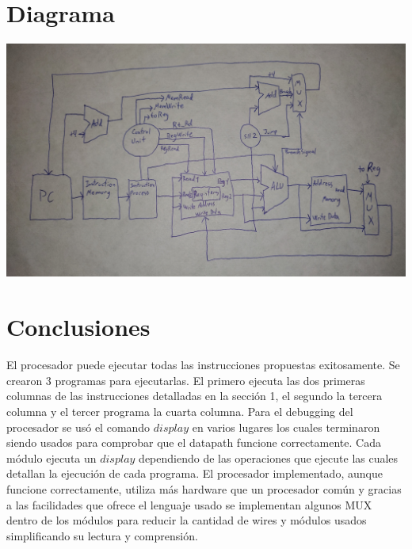\documentclass[12pt,a4paper]{article}
\begin{document}
\section{Diagrama}

\includegraphics[width=14cm]{./datapath.jpg}

\newpage

\section{Conclusiones}
El procesador puede ejecutar todas las instrucciones propuestas exitosamente. Se crearon 3 programas para ejecutarlas. El primero ejecuta las dos primeras columnas de las instrucciones detalladas en la sección 1, el segundo la tercera columna y el tercer programa la cuarta columna. Para el debugging del procesador se usó el comando $display$ en varios lugares los cuales terminaron siendo usados para comprobar que el datapath funcione correctamente. Cada módulo ejecuta un $display$ dependiendo de las operaciones que ejecute las cuales detallan la ejecución de cada programa. El procesador implementado, aunque funcione correctamente, utiliza más hardware que un procesador común y gracias a las facilidades que ofrece el lenguaje usado se implementan algunos MUX dentro de los módulos  para reducir la cantidad de wires y módulos usados simplificando su lectura y comprensión.
\end{document}
